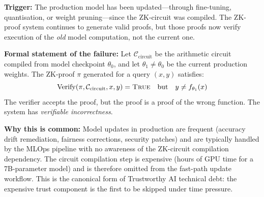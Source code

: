 \begin{tcolorbox}[scenariobox,
  title={Scenario 2 --- The Stale ZK-Circuit (Type~2 Debt)}]

\textbf{Trigger:}
The production model has been updated---through fine-tuning,
quantisation, or weight pruning---since the ZK-circuit was
compiled.
The ZK-proof system continues to generate valid proofs, but
those proofs now verify execution of the \emph{old} model
computation, not the current one.

\textbf{Formal statement of the failure:}
Let $\mathcal{C}_{\mathrm{circuit}}$ be the arithmetic circuit
compiled from model checkpoint $\theta_0$, and let
$\theta_1 \neq \theta_0$ be the current production weights.
The ZK-proof $\pi$ generated for a query $(x, y)$ satisfies:
\begin{equation}
  \label{eq:stale-circuit}
  \mathrm{Verify}(\pi, \mathcal{C}_{\mathrm{circuit}}, x, y)
    = \textsc{True}
  \quad \text{but} \quad
  y \neq f_{\theta_1}(x)
\end{equation}
The verifier accepts the proof, but the proof is a proof of
the wrong function.
The system has \emph{verifiable incorrectness}.

\textbf{Why this is common:}
Model updates in production are frequent (accuracy drift
remediation, fairness corrections, security patches) and are
typically handled by the MLOps pipeline with no awareness of
the ZK-circuit compilation dependency.
The circuit compilation step is expensive (hours of GPU time
for a 7B-parameter model) and is therefore omitted from
the fast-path update workflow.
This is the canonical form of Trustworthy AI technical debt:
the expensive trust component is the first to be skipped
under time pressure.
\end{tcolorbox}

